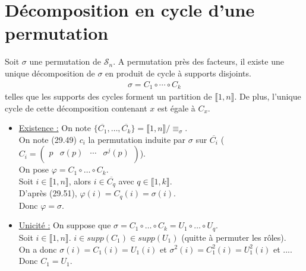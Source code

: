 \documentclass[../main.tex]{subfiles}
\begin{document}
\section{Décomposition en cycle d'une permutation}
\begin{tcolorbox}[title=Théorème 29.52, title filled=false, colframe=orange, colback=orange!10!white]
    Soit $\sigma$ une permutation de $\mathcal{S}_n$. A permutation près des facteurs, il existe une unique décomposition de $\sigma$ en produit de cycle à supports disjoints. 
    \begin{align*}
        \sigma = C_1\circ \cdots\circ C_k
    \end{align*}
    telles que les supports des cycles forment un partition de $\llbracket 1, n \rrbracket$. De plus, l'unique cycle de cette décomposition contenant $x$ est égale à $C_x$. 
\end{tcolorbox}

\begin{itemize}
    \item \underline{Existence :} On note $\{ \overline{C_1}, \ldots, \overline{C_k} \} = \llbracket 1, n \rrbracket / \equiv_\sigma$. \\
    On note (29.49) $c_i$ la permutation induite par $\sigma$ sur $\overline{C_i}$ ($C_i = \begin{pmatrix}
        p & \sigma(p) & \cdots & \sigma^{j}(p) \\
    \end{pmatrix}$). \\
    On pose $\varphi = C_1 \circ \ldots \circ C_k$. \\
    Soit $i\in \llbracket 1, n \rrbracket$, alors $i\in \overline{C_q}$ avec $q\in \llbracket 1, k \rrbracket$. \\
    D'après (29.51), $\varphi(i) = C_q(i) = \sigma(i)$. \\
    Donc $\varphi = \sigma$. 
    \item \underline{Unicité :} On suppose que $\sigma = C_1 \circ \ldots \circ C_k = U_1 \circ \ldots \circ U_q$. \\
    Soit $i\in \llbracket 1, n \rrbracket$. $i\in supp(C_1) \in supp(U_1)$ (quitte à permuter les rôles). \\
    On a donc $\sigma(i) = C_1(i) = U_1(i)$ et $\sigma^2(i) = C_1^2(i) = U_1^2(i)$ et .... \\
    Donc $C_1 = U_1$. 
\end{itemize}

\end{document}
